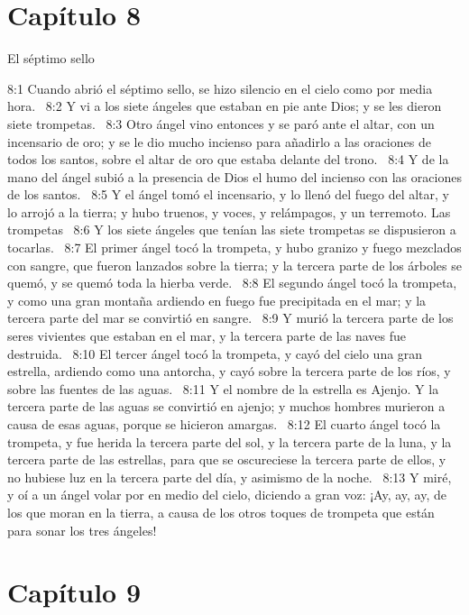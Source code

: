 \section*{Capítulo 8 }
El séptimo sello  

8:1 Cuando abrió el séptimo sello, se hizo silencio en el cielo como por media hora.  
8:2 Y vi a los siete ángeles que estaban en pie ante Dios; y se les dieron siete trompetas.  
8:3 Otro ángel vino entonces y se paró ante el altar, con un incensario de oro; y se le dio mucho incienso para añadirlo a las oraciones de todos los santos, sobre el altar de oro que estaba delante del trono.  
8:4 Y de la mano del ángel subió a la presencia de Dios el humo del incienso con las oraciones de los santos.  
8:5 Y el ángel tomó el incensario, y lo llenó del fuego del altar, y lo arrojó a la tierra; y hubo truenos, y voces, y relámpagos, y un terremoto. 
Las trompetas  
8:6 Y los siete ángeles que tenían las siete trompetas se dispusieron a tocarlas.  
8:7 El primer ángel tocó la trompeta, y hubo granizo y fuego mezclados con sangre, que fueron lanzados sobre la tierra; y la tercera parte de los árboles se quemó, y se quemó toda la hierba verde.  
8:8 El segundo ángel tocó la trompeta, y como una gran montaña ardiendo en fuego fue precipitada en el mar; y la tercera parte del mar se convirtió en sangre.  
8:9 Y murió la tercera parte de los seres vivientes que estaban en el mar, y la tercera parte de las naves fue destruida.  
8:10 El tercer ángel tocó la trompeta, y cayó del cielo una gran estrella, ardiendo como una antorcha, y cayó sobre la tercera parte de los ríos, y sobre las fuentes de las aguas.  
8:11 Y el nombre de la estrella es Ajenjo. Y la tercera parte de las aguas se convirtió en ajenjo; y muchos hombres murieron a causa de esas aguas, porque se hicieron amargas.  
8:12 El cuarto ángel tocó la trompeta, y fue herida la tercera parte del sol, y la tercera parte de la luna, y la tercera parte de las estrellas, para que se oscureciese la tercera parte de ellos, y no hubiese luz en la tercera parte del día, y asimismo de la noche.  
8:13 Y miré, y oí a un ángel volar por en medio del cielo, diciendo a gran voz: ¡Ay, ay, ay, de los que moran en la tierra, a causa de los otros toques de trompeta que están para sonar los tres ángeles!  
\section*{Capítulo 9 }

